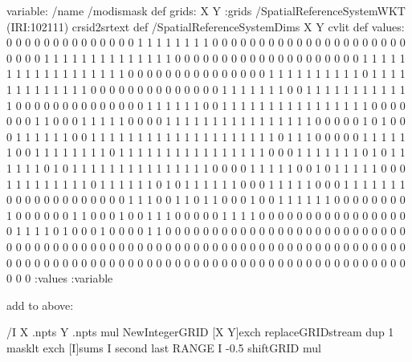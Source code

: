 \begin{ingrid}
variable:
/name /modismask def
grids: X Y :grids
/SpatialReferenceSystemWKT (IRI:102111) crsid2srtext def
/SpatialReferenceSystemDims { X Y } cvlit  def
values:
0 0 0 0 0 0 0 0 0 0 0 0 0 0 1 1 1 1 1 1 1 1 0 0 0 0 0 0 0 0 0 0 0 0 0 0
0 0 0 0 0 0 0 0 0 0 0 1 1 1 1 1 1 1 1 1 1 1 1 1 1 0 0 0 0 0 0 0 0 0 0 0
0 0 0 0 0 0 0 0 0 1 1 1 1 1 1 1 1 1 1 1 1 1 1 1 1 1 1 0 0 0 0 0 0 0 0 0
0 0 0 0 0 0 1 1 1 1 1 1 1 1 1 1 0 1 1 1 1 1 1 1 1 1 1 1 1 1 0 0 0 0 0 0
0 0 0 0 0 0 0 0 1 1 1 1 1 1 1 0 0 1 1 1 1 1 1 1 1 1 1 1 1 0 0 0 0 0 0 0
0 0 0 0 0 0 0 1 1 1 1 1 1 0 0 1 1 1 1 1 1 1 1 1 1 1 1 1 1 1 1 0 0 0 0 0
0 0 1 1 0 0 0 1 1 1 1 1 0 0 0 0 1 1 1 1 1 1 1 1 1 1 1 1 1 1 1 1 0 0 0 0
0 1 0 1 0 0 0 1 1 1 1 1 1 0 0 1 1 1 1 1 1 1 1 1 1 1 1 1 1 1 1 1 1 1 1 0
1 1 1 0 0 0 0 0 1 1 1 1 1 1 0 0 1 1 1 1 1 1 1 1 0 1 1 1 1 1 1 1 1 1 1 1
1 1 1 1 1 0 0 0 1 1 1 1 1 1 1 0 1 0 1 1 1 1 1 1 0 1 0 1 1 1 1 1 1 1 1 1
1 1 1 1 1 1 0 0 0 0 1 1 1 1 1 0 0 1 0 1 1 1 1 1 0 0 0 1 1 1 1 1 1 1 1 1
0 1 1 1 1 1 1 0 1 0 1 1 1 1 1 1 0 0 0 1 1 1 1 1 0 0 0 1 1 1 1 1 1 1 0 0
0 0 0 0 0 0 0 0 0 0 0 1 1 1 0 0 1 1 0 1 1 0 0 0 1 0 0 1 1 1 1 1 1 0 0 0
0 0 0 0 0 1 0 0 0 0 0 0 1 1 0 0 0 1 0 0 1 1 1 0 0 0 0 0 1 1 1 1 0 0 0 0
0 0 0 0 0 0 0 0 0 0 0 0 0 1 1 1 1 0 1 0 0 0 1 0 0 0 0 1 1 0 0 0 0 0 0 0
0 0 0 0 0 0 0 0 0 0 0 0 0 0 0 0 0 0 0 0 0 0 0 0 0 0 0 0 0 0 0 0 0 0 0 0
0 0 0 0 0 0 0 0 0 0 0 0 0 0 0 0 0 0 0 0 0 0 0 0 0 0 0 0 0 0 0 0 0 0 0 0
0 0 0 0 0 0 0 0 0 0 0 0 0 0 0 0 0 0 0 0 0 0 0 0 0 0 0 0 0 0 0 0 0 0 0 0
:values
:variable
\end{ingrid}
add to above:

  /I X .npts
       Y .npts mul
       NewIntegerGRID
      [X Y]exch replaceGRIDstream
     dup
      1 masklt
      exch
      [I]sums
      I second last RANGE
      I -0.5 shiftGRID
      mul


